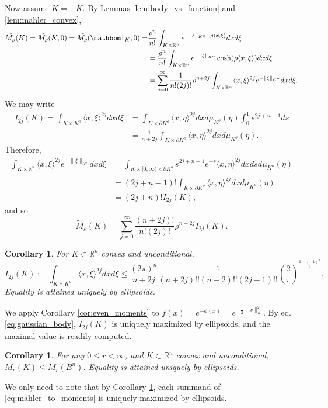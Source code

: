 \documentclass[reqno,10pt]{amsart}
\newcounter{mp}
\newtheorem{Corollary}[Proposition]{Corollary}
\newcommand{\R}{\mathbb{R}}
\begin{document}
Now assume $K=-K$. By Lemmas \ref{lem:body_vs_function} and \ref{lem:mahler_convex}, 
\begin{align*}
	\widetilde M_\rho(K)=\widetilde M_\rho(K,0)=\widetilde M_\rho(\mathbbm 1_K, 0)=&\frac{\rho^n}{n!}\int_{K\times\R^n}e^{-\|\xi\|_{K^o}+\rho\langle x,\xi\rangle}dxd\xi\\&=\frac{\rho^n}{n!}\int_{K\times\R^n}e^{-\|\xi\|_{K^o}}\cosh(\rho\langle x,\xi\rangle)dxd\xi
	\\&=\sum_{j=0}^\infty \frac{1}{n!(2j)!}\rho^{n+2j}\int_{K\times\R^n}\langle x, \xi\rangle^{2j}e^{-\|\xi\|_{K^o}}dxd\xi.
\end{align*} 
We may write 
\begin{align*}I_{2j}(K)=\int_{K\times K^o}\langle x,\xi\rangle^{2j}dxd\xi&=\int_{K\times\partial K^o}\langle x,\eta\rangle^{2j}dxd\mu_{K^o}(\eta)\int_0^1s^{2j+n-1}ds\\&=\frac{1}{n+2j}\int_{K\times\partial K^o}\langle x,\eta\rangle^{2j}dxd\mu_{K^o}(\eta).\end{align*}
Therefore, 
\begin{align*}\int_{K\times\R^n}\langle x, \xi\rangle^{2j}e^{-\|\xi\|_{K^o}}dxd\xi &=\int_{K\times [0,\infty)\times \partial K^o} s^{2j+n-1}e^{-s}\langle x,\eta\rangle ^{2j}dxds d\mu_{K^o}(\eta)\\&=(2j+n-1)!\int_{K\times\partial K^o}\langle x, \eta\rangle^{2j}dxd\mu_{K^o}(\eta)\\&=(2j+n)!I_{2j}(K),\end{align*}
and so
\[	\widetilde M_\rho(K) = \sum_{j=0}^\infty \frac{(n+2j)!}{n!(2j)!}\rho^{n+2j}I_{2j}(K). \]
\endproof


\begin{Corollary}\label{cor:bodies_moments}
	For $K\subset \R^n $ convex and unconditional, 
	$$ I_{2j}(K):=\int_{K\times K^o} \langle x,\xi\rangle^{2j}dxd\xi\leq \frac{(2\pi)^n}{n+2j}\frac{1}{ (n+2j)!!(n-2)!!(2j-1)!!} \left(\frac2\pi\right)^{\frac{1-(-1)^n}{2} }.$$ Equality is attained uniquely by ellipsoids.
\end{Corollary}
\proof
We apply Corollary \ref{cor:even_moments} to $f(x)=e^{-\phi(x)}=e^{-\frac12 \|x\|_K^2}$.  By eq. \eqref{eq:gaussian_body}, $I_{2j}(K)$ is uniquely maximized by ellipsoids, and the maximal value is readily computed.
\endproof


\begin{Corollary}\label{cor:bodies_mahler}
	For any $0\leq  r<\infty$, and $K\subset \R^n$ convex and unconditional, $M_r(K)\leq  M_r(B^n)$. Equality is attained uniquely by ellipsoids.
\end{Corollary}
\proof
We only need to note that by Corollary \ref{cor:bodies_moments}, each summand of \eqref{eq:mahler_to_moments} is uniquely maximized by ellipsoids.
\endproof
\end{document}
